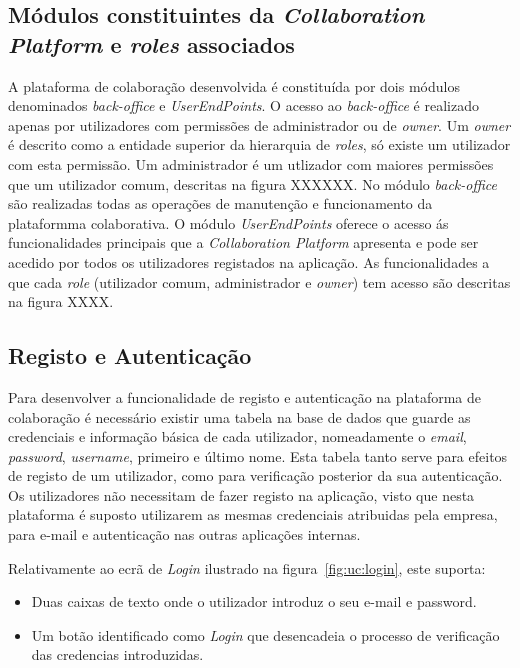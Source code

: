 \subsection{Módulos constituintes da \textit{Collaboration Platform} e \textit{roles} associados}

A plataforma de colaboração desenvolvida é constituída por dois módulos denominados \textit{back-office} e \textit{UserEndPoints}. 
O acesso ao \textit{back-office} é realizado apenas por utilizadores com permissões de administrador ou de \textit{owner}. 
Um \textit{owner} é descrito como a entidade superior da hierarquia de \textit{roles}, só existe um utilizador com esta permissão. 
Um administrador é um utlizador com maiores permissões que um utilizador comum, descritas na figura XXXXXX. 
No módulo \textit{back-office} são realizadas todas as operações de manutenção e funcionamento da plataformma colaborativa.
O módulo \textit{UserEndPoints} oferece o acesso ás funcionalidades principais que a \textit{Collaboration Platform} apresenta e pode ser acedido por todos os utilizadores registados na aplicação.
As funcionalidades a que cada \textit{role} (utilizador comum, administrador e \textit{owner}) tem acesso são descritas na figura XXXX.


\subsection{Registo e Autenticação}\label{subsec:login}

Para desenvolver a funcionalidade de registo e autenticação na plataforma de colaboração é necessário existir uma tabela 
na base de dados que guarde as credenciais e informação básica de cada utilizador, nomeadamente 
o \textit{email}, \textit{password}, \textit{username}, primeiro e último nome. 
Esta tabela tanto serve para efeitos de registo de um utilizador, como para verificação posterior da sua autenticação. 
Os utilizadores não necessitam de fazer registo na aplicação, visto que nesta plataforma é suposto utilizarem 
as mesmas credenciais atribuidas pela empresa, para e-mail e autenticação nas outras aplicações internas.

Relativamente ao ecrã de \textit{Login} ilustrado na figura~\ref{fig:uc:login}, este suporta:

\begin{itemize}
    \item Duas caixas de texto onde o utilizador introduz o seu e-mail e password.
    \item Um botão identificado como \textit{Login} que desencadeia o processo de verificação das credencias introduzidas.
\end{itemize}

